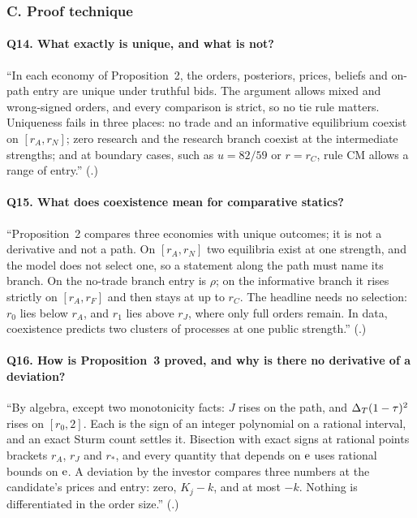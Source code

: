 \subsubsection*{C. Proof technique}

\paragraph{Q14. What exactly is unique, and what is not?}
``In each economy of Proposition~2, the orders, posteriors, prices, beliefs and on-path entry are unique under
truthful bids. The argument allows mixed and wrong-signed orders, and every comparison is strict, so no tie rule
matters. Uniqueness fails in three places: no trade and an informative equilibrium coexist on \([r_A,r_N]\); zero
research and the research branch coexist at the intermediate strengths; and at boundary cases, such as \(u=82/59\)
or \(r=r_C\), rule CM allows a range of entry.''
(.)

\paragraph{Q15. What does coexistence mean for comparative statics?}
``Proposition~2 compares three economies with unique outcomes; it is not a derivative and not a path. On
\([r_A,r_N]\) two equilibria exist at one strength, and the model does not select one, so a statement along the path
must name its branch. On the no-trade branch entry is \(\rho\); on the informative branch it rises strictly on
\([r_A,r_F]\) and then stays at  up to \(r_C\). The headline needs no selection: \(r_0\) lies below
\(r_A\), and \(r_1\) lies above \(r_J\), where only full orders remain. In data, coexistence predicts two clusters of
processes at one public strength.'' (.)

\paragraph{Q16. How is Proposition~3 proved, and why is there no derivative of a deviation?}
``By algebra, except two monotonicity facts: \(J\) rises on the path, and \(\Delta_T(1-\tau)^2\) rises on \([r_0,2]\). Each
is the sign of an integer polynomial on a rational interval, and an exact Sturm count settles it. Bisection with exact
signs at rational points brackets \(r_A\), \(r_J\) and \(r_*\), and every quantity that depends on \(\mathrm{e}\) uses
rational bounds on \(\mathrm{e}\). A deviation by the investor compares three numbers at the candidate's prices and entry:
zero, \(K_j-k\), and at most \(-k\). Nothing is differentiated in the order size.''
(.)

